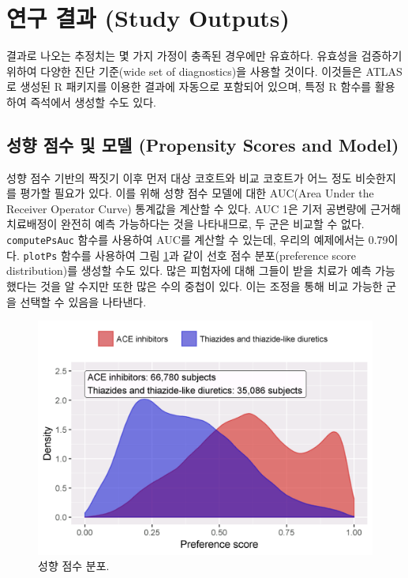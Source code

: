 \documentclass[11pt]{book}
\theoremstyle{definition}
\theoremstyle{definition}
\theoremstyle{definition}
\theoremstyle{remark}
\begin{document}
\section{연구 결과 (Study Outputs)}\label{studyOutputs}

결과로 나오는 추정치는 몇 가지 가정이 충족된 경우에만 유효하다. 유효성을
검증하기 위하여 다양한 진단 기준(wide set of diagnostics)을 사용할
것이다. 이것들은 ATLAS로 생성된 R 패키지를 이용한 결과에 자동으로
포함되어 있으며, 특정 R 함수를 활용하여 즉석에서 생성할 수도 있다.

\subsection{성향 점수 및 모델 (Propensity Scores and
Model)}\label{----propensity-scores-and-model}

성향 점수 기반의 짝짓기 이후 먼저 대상 코호트와 비교 코호트가 어느 정도
비슷한지를 평가할 필요가 있다. 이를 위해 성향 점수 모델에 대한 AUC(Area
Under the Receiver Operator Curve) 통계값을 계산할 수 있다. AUC 1은 기저
공변량에 근거해 치료배정이 완전히 예측 가능하다는 것을 나타내므로, 두
군은 비교할 수 없다. \texttt{computePsAuc} 함수를 사용하여 AUC를 계산할
수 있는데, 우리의 예제에서는 0.79이다. \texttt{plotPs} 함수를 사용하여
그림 \ref{fig:ps}과 같이 선호 점수 분포(preference score distribution)를
생성할 수도 있다. 많은 피험자에 대해 그들이 받을 치료가 예측 가능했다는
것을 알 수지만 또한 많은 수의 중첩이 있다. 이는 조정을 통해 비교 가능한
군을 선택할 수 있음을 나타낸다.

\begin{figure}

{\centering \includegraphics[width=0.8\linewidth]{images/PopulationLevelEstimation/ps} 

}

\caption{성향 점수 분포.}\label{fig:ps}
\end{figure}
\end{document}
